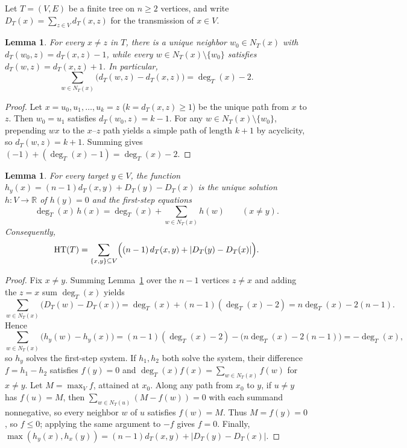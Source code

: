 \documentclass[11pt]{article}
\newtheorem{lemma}[theorem]{Lemma}
\newcommand{\HT}{\operatorname{HT}}
\begin{document}
Let $T = (V, E)$ be a finite tree on $n \ge 2$ vertices, and write $D_T(x) = \sum_{z \in V} d_T(x, z)$ for the transmission of $x \in V$.

\begin{lemma}\label{lem:neighbor}
For every $x \ne z$ in $T$, there is a unique neighbor $w_0 \in N_T(x)$ with $d_T(w_0, z) = d_T(x, z) - 1$, while every $w \in N_T(x) \setminus \{w_0\}$ satisfies $d_T(w, z) = d_T(x, z) + 1$. In particular,
\[
  \sum_{w \in N_T(x)} \bigl(d_T(w, z) - d_T(x, z)\bigr) = \deg_T(x) - 2.
\]
\end{lemma}

\begin{proof}
Let $x = u_0, u_1, \dots, u_k = z$ ($k = d_T(x, z) \ge 1$) be the unique path from $x$ to $z$. Then $w_0 = u_1$ satisfies $d_T(w_0, z) = k - 1$. For any $w \in N_T(x) \setminus \{w_0\}$, prepending $wx$ to the $x$--$z$ path yields a simple path of length $k + 1$ by acyclicity, so $d_T(w, z) = k + 1$. Summing gives $(-1) + (\deg_T(x) - 1) = \deg_T(x) - 2$.
\end{proof}

\begin{lemma}\label{lem:hit}
For every target $y \in V$, the function $h_y(x) = (n - 1) d_T(x, y) + D_T(y) - D_T(x)$ is the unique solution $h : V \to \mathbb{R}$ of $h(y) = 0$ and the first-step equations
\[
  \deg_T(x)\, h(x) = \deg_T(x) + \sum_{w \in N_T(x)} h(w) \qquad (x \ne y).
\]
Consequently,
\begin{equation}\label{eq:ht-tree}
  \HT(T) = \sum_{\{x, y\} \subseteq V} \Bigl((n - 1)\, d_T(x, y) + |D_T(y) - D_T(x)|\Bigr).
\end{equation}
\end{lemma}

\begin{proof}
Fix $x \ne y$. Summing Lemma~\ref{lem:neighbor} over the $n - 1$ vertices $z \ne x$ and adding the $z = x$ sum $\deg_T(x)$ yields
\[
  \sum_{w \in N_T(x)} \bigl(D_T(w) - D_T(x)\bigr) = \deg_T(x) + (n - 1)(\deg_T(x) - 2) = n \deg_T(x) - 2(n - 1).
\]
Hence
\[
  \sum_{w \in N_T(x)} \bigl(h_y(w) - h_y(x)\bigr) = (n - 1)(\deg_T(x) - 2) - \bigl(n \deg_T(x) - 2(n - 1)\bigr) = -\deg_T(x),
\]
so $h_y$ solves the first-step system. If $h_1, h_2$ both solve the system, their difference $f = h_1 - h_2$ satisfies $f(y) = 0$ and $\deg_T(x) f(x) = \sum_{w \in N_T(x)} f(w)$ for $x \ne y$. Let $M = \max_V f$, attained at $x_0$. Along any path from $x_0$ to $y$, if $u \ne y$ has $f(u) = M$, then $\sum_{w \in N_T(u)} (M - f(w)) = 0$ with each summand nonnegative, so every neighbor $w$ of $u$ satisfies $f(w) = M$. Thus $M = f(y) = 0$, so $f \le 0$; applying the same argument to $-f$ gives $f = 0$. Finally, $\max(h_y(x), h_x(y)) = (n - 1) d_T(x, y) + |D_T(y) - D_T(x)|$.
\end{proof}
\end{document}
